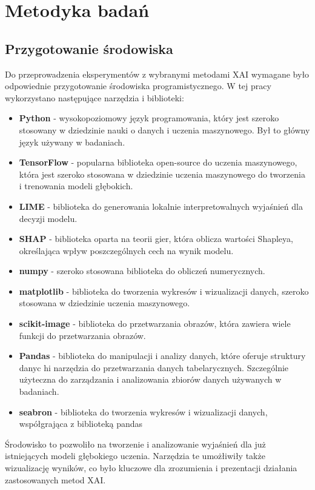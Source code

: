 
\chapter*{Metodyka badań}

\section*{Przygotowanie środowiska}

Do przeprowadzenia eksperymentów z wybranymi metodami XAI wymagane było odpowiednie przygotowanie środowiska programistycznego.
W tej pracy wykorzystano  następujące narzędzia i biblioteki:
\begin{itemize}
	\item \textbf{Python} - wysokopoziomowy język programowania, który jest szeroko stosowany w dziedzinie nauki o danych i uczenia maszynowego.
	      Był to główny język używany w badaniach.
	\item \textbf{TensorFlow} - popularna biblioteka open-source do uczenia maszynowego, która jest szeroko stosowana w dziedzinie uczenia maszynowego do tworzenia i trenowania modeli głębokich.
	\item \textbf{LIME} - biblioteka do generowania lokalnie interpretowalnych wyjaśnień dla decyzji modelu.
	\item \textbf{SHAP} - biblioteka oparta na teorii gier, która oblicza wartości Shapleya, określająca wpływ poszczególnych cech na wynik modelu.
	\item \textbf{numpy} - szeroko stosowana biblioteka do obliczeń numerycznych.
	\item \textbf{matplotlib} - biblioteka do tworzenia wykresów i wizualizacji danych, szeroko stosowana w dziedzinie uczenia maszynowego.
	\item \textbf{scikit-image} - biblioteka do przetwarzania obrazów, która zawiera wiele funkcji do przetwarzania obrazów.
	\item \textbf{Pandas} - biblioteka do manipulacji i analizy danych, które oferuje struktury danyc hi narzędzia do przetwarzania danych tabelarycznych.
	      Szczególnie użyteczna do zarządzania i analizowania zbiorów danych używanych w badaniach.
	\item \textbf{seabron} - biblioteka do tworzenia wykresów i wizualizacji danych, współgrająca z biblioteką pandas
\end{itemize}
Środowisko to pozwoliło na tworzenie i analizowanie wyjaśnień dla już istniejących modeli głębokiego uczenia.
Narzędzia te umożłiwiły także wizualizację wyników, co było kluczowe dla zrozumienia i prezentacji działania zastosowanych metod XAI.


